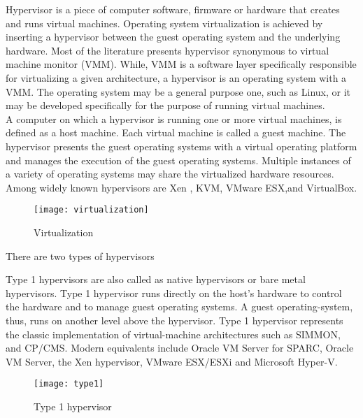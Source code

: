 Hypervisor is a piece of computer software, firmware or hardware that creates and runs virtual machines. Operating system virtualization is achieved by inserting a hypervisor between the guest operating system and the underlying hardware. Most of the literature presents hypervisor synonymous to virtual machine monitor (VMM). While, VMM is a software layer specifically responsible for virtualizing a given architecture, a hypervisor is an operating system with a VMM. The operating system may be a general purpose one, such as Linux, or it may be developed specifically for the purpose of running virtual machines\cite{Agesen:2010:EXV:1899928.1899930}.
\\
A computer on which a hypervisor is running one or more virtual machines, is defined as a host machine. Each virtual machine is called a guest machine. The hypervisor presents the guest operating systems with a virtual operating platform and manages the execution of the guest operating systems. Multiple instances of a variety of operating systems may share the virtualized hardware resources. Among widely known hypervisors are Xen \cite{Barham:2003:XAV:1165389.945462, Chisnall:2007:DGX:1407351}, KVM\cite{Habib:2008:VK:1344209.1344217, kivity07kvm}, VMware ESX\cite{Agesen:2010:EXV:1899928.1899930},and VirtualBox\cite{citeulike:3149886}.
\\
\begin{figure}[!ht]
\centering
\texttt{[image: virtualization]}
\caption{Virtualization}
\label{fig:Virtualization}
\end{figure}
There are two types of hypervisors \cite{Goldberg:1973:AVM:800122.803950}
\begin{description}
\item Type 1 hypervisors are also called as native hypervisors or bare metal hypervisors. Type 1 hypervisor runs directly on the host's hardware to control the hardware and to manage guest operating systems. A guest operating-system, thus, runs on another level above the hypervisor. Type 1 hypervisor represents the classic implementation of virtual-machine architectures such as SIMMON, and CP/CMS. Modern equivalents include Oracle VM Server for SPARC, Oracle VM Server, the Xen hypervisor\cite{Barham:2003:XAV:1165389.945462}, VMware ESX/ESXi\cite{Agesen:2010:EXV:1899928.1899930} and Microsoft Hyper-V.
\end{description}
\begin{figure}[!ht]
\centering
\texttt{[image: type1]}
\caption{Type 1 hypervisor}
\label{Type 1 hypervisor}
\end{figure}
